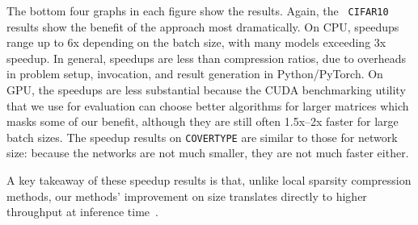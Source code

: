 The bottom four graphs in each figure show the results.  Again, the {\tt
CIFAR10} results show the benefit of the \shrink approach most dramatically.  On
CPU, speedups range up to 6x depending on the batch size, with many models
exceeding 3x speedup. In general, speedups are less than compression ratios, due
to overheads in problem setup, invocation, and result generation  in
Python/PyTorch.  On GPU, the speedups are less substantial because the CUDA
benchmarking utility that we use for evaluation can choose better algorithms for
larger matrices which masks some of our benefit, although they are still often
1.5x--2x faster for large batch sizes.  The speedup results on {\tt COVERTYPE}
are similar to those for network size:  because the networks are not much
smaller, they are not much faster either.

A key takeaway of these speedup results is that, unlike local sparsity
compression methods, our methods' improvement on size translates directly to
higher throughput at inference time~\cite{Han2015}.



